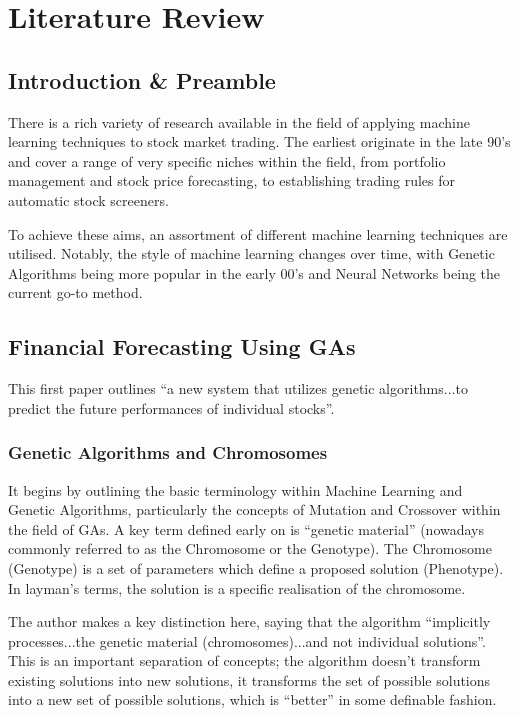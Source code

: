 \section{Literature Review}
\subsection{Introduction \& Preamble}
There is a rich variety of research available in the field of applying machine learning techniques to stock market trading. The earliest originate in the late 90's and cover a range of very specific niches within the field, from portfolio management and stock price forecasting, to establishing trading rules for automatic stock screeners. \newline

To achieve these aims, an assortment of different machine learning techniques are utilised. Notably, the style of machine learning changes over time, with Genetic Algorithms being more popular in the early 00's and Neural Networks being the current go-to method.

\subsection{Financial Forecasting Using GAs \cite{mahfoudMani}}
This first paper outlines ``a new system that utilizes genetic algorithms...to predict the future performances of individual stocks''.

\subsubsection{Genetic Algorithms and Chromosomes}

It begins by outlining the basic terminology within Machine Learning and Genetic Algorithms, particularly the concepts of Mutation and Crossover within the field of GAs. A key term defined early on is ``genetic material'' (nowadays commonly referred to as the Chromosome or the Genotype). The Chromosome (Genotype) is a set of parameters which define a proposed solution (Phenotype). In layman's terms, the solution is a specific realisation of the chromosome. \newline

The author makes a key distinction here, saying that the algorithm ``implicitly processes...the genetic material (chromosomes)...and not individual solutions''. This is an important separation of concepts; the algorithm doesn't transform existing solutions into new solutions, it transforms the set of possible solutions into a new set of possible solutions, which is ``better'' in some definable fashion. \newline

